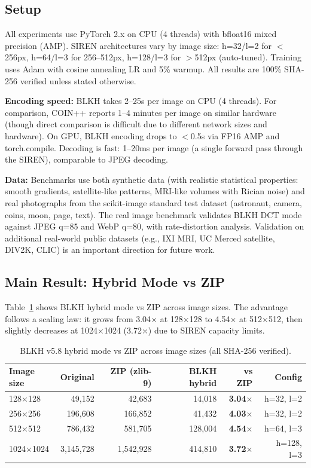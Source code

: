 \documentclass[11pt,a4paper]{article}
\begin{document}
\subsection{Setup}

All experiments use PyTorch 2.x on CPU (4 threads) with bfloat16 mixed precision (AMP). SIREN architectures vary by image size: h=32/l=2 for $<$256px, h=64/l=3 for 256--512px, h=128/l=3 for $>$512px (auto-tuned). Training uses Adam with cosine annealing LR and 5\% warmup. All results are 100\% SHA-256 verified unless stated otherwise.

\textbf{Encoding speed:} BLKH takes 2--25s per image on CPU (4 threads). For comparison, COIN++ \cite{dupont2022coin++} reports 1--4 minutes per image on similar hardware (though direct comparison is difficult due to different network sizes and hardware). On GPU, BLKH encoding drops to $<$0.5s via FP16 AMP and torch.compile. Decoding is fast: 1--20ms per image (a single forward pass through the SIREN), comparable to JPEG decoding.

\textbf{Data:} Benchmarks use both synthetic data (with realistic statistical properties: smooth gradients, satellite-like patterns, MRI-like volumes with Rician noise) and real photographs from the scikit-image standard test dataset (astronaut, camera, coins, moon, page, text). The real image benchmark validates BLKH DCT mode against JPEG q=85 and WebP q=80, with rate-distortion analysis. Validation on additional real-world public datasets (e.g., IXI MRI, UC Merced satellite, DIV2K, CLIC) is an important direction for future work.

\subsection{Main Result: Hybrid Mode vs ZIP}

Table~\ref{tab:hybrid_scaling} shows BLKH hybrid mode vs ZIP across image sizes. The advantage follows a scaling law: it grows from 3.04$\times$ at 128$\times$128 to 4.54$\times$ at 512$\times$512, then slightly decreases at 1024$\times$1024 (3.72$\times$) due to SIREN capacity limits.

\begin{table}[t]
\centering
\caption{BLKH v5.8 hybrid mode vs ZIP across image sizes (all SHA-256 verified).}
\label{tab:hybrid_scaling}
\begin{tabular}{lrrrrr}
\toprule
Image size & Original & ZIP (zlib-9) & BLKH hybrid & vs ZIP & Config \\
\midrule
128$\times$128 & 49,152 & 42,683 & 14,018 & \textbf{3.04$\times$} & h=32, l=2 \\
256$\times$256 & 196,608 & 166,852 & 41,432 & \textbf{4.03$\times$} & h=32, l=2 \\
512$\times$512 & 786,432 & 581,705 & 128,004 & \textbf{4.54$\times$} & h=64, l=3 \\
1024$\times$1024 & 3,145,728 & 1,542,928 & 414,810 & \textbf{3.72$\times$} & h=128, l=3 \\
\bottomrule
\end{tabular}
\end{table}
\end{document}
